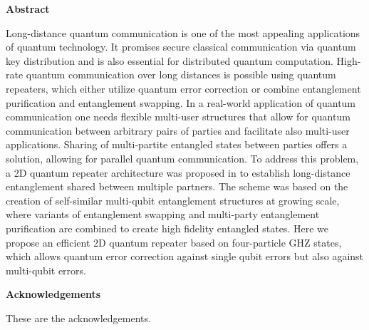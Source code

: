 \documentclass[10pt,a4paper]{book}
\numberwithin{equation}{chapter}
\numberwithin{figure}{chapter}
\numberwithin{table}{chapter}
\begin{document}
\newenvironment{abstract}%
    {\cleardoublepage\thispagestyle{empty}\null\vfill\begin{center}%
    \bfseries Abstract \end{center}}%
    {\vfill\null}
\begin{abstract}
Long-distance quantum communication is one of the most appealing applications of quantum technology. It
promises secure classical communication via quantum key distribution and is also essential for distributed quantum computation. High-rate quantum communication over long distances is possible using quantum repeaters, which either utilize quantum error correction or combine entanglement purification and entanglement swapping. In a real-world application of quantum communication one needs flexible multi-user structures that allow for quantum communication between arbitrary pairs of parties and facilitate also multi-user applications. Sharing of multi-partite entangled states between parties offers a solution, allowing for parallel quantum communication. To address this problem, a 2D quantum repeater architecture was proposed in \cite{twodim} to establish long-distance entanglement shared between multiple partners. The scheme was based on the creation of self-similar multi-qubit entanglement structures at growing scale, where variants of entanglement swapping and multi-party entanglement purification are combined to create high fidelity entangled states. Here we propose an efficient 2D quantum repeater based on four-particle GHZ states, which allows quantum error correction against single qubit errors but also against multi-qubit errors. 
\end{abstract}

\newenvironment{acknowledgements}%
    {\cleardoublepage\thispagestyle{empty}\null\vfill\begin{center}%
    \bfseries Acknowledgements\end{center}}%
    {\vfill\null}
    \begin{acknowledgements}
        These are the acknowledgements.
        \end{acknowledgements}

\tableofcontents


\mainmatter %

\pagestyle{thesis}
\end{document}
